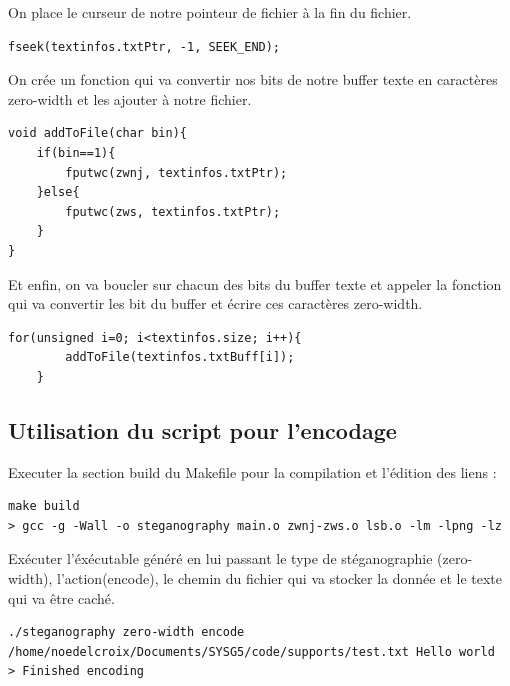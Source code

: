 On place le curseur de notre pointeur de fichier à la fin du fichier.
\newline
\begin{lstlisting}
fseek(textinfos.txtPtr, -1, SEEK_END);
\end{lstlisting}
On crée un fonction qui va convertir nos bits de notre buffer texte en caractères zero-width et les ajouter à notre fichier.
\newline
\begin{lstlisting}
void addToFile(char bin){
    if(bin==1){
        fputwc(zwnj, textinfos.txtPtr);
    }else{
        fputwc(zws, textinfos.txtPtr);
    }
}
\end{lstlisting}
Et enfin, on va boucler sur chacun des bits du buffer texte et appeler la fonction qui va convertir les bit du buffer et écrire ces caractères zero-width.
\begin{lstlisting}
for(unsigned i=0; i<textinfos.size; i++){
        addToFile(textinfos.txtBuff[i]);
    }
\end{lstlisting}

\subsection{Utilisation du script pour l'encodage}
Executer la section build du Makefile pour la compilation et l'édition des liens :
\begin{lstlisting}
make build
> gcc -g -Wall -o steganography main.o zwnj-zws.o lsb.o -lm -lpng -lz
\end{lstlisting}

Exécuter l'éxécutable généré en lui passant le type de stéganographie (zero-width), l'action(encode), le chemin du fichier qui va stocker la donnée et le texte qui va être caché.
\begin{lstlisting}
./steganography zero-width encode /home/noedelcroix/Documents/SYSG5/code/supports/test.txt Hello world
> Finished encoding
\end{lstlisting}

